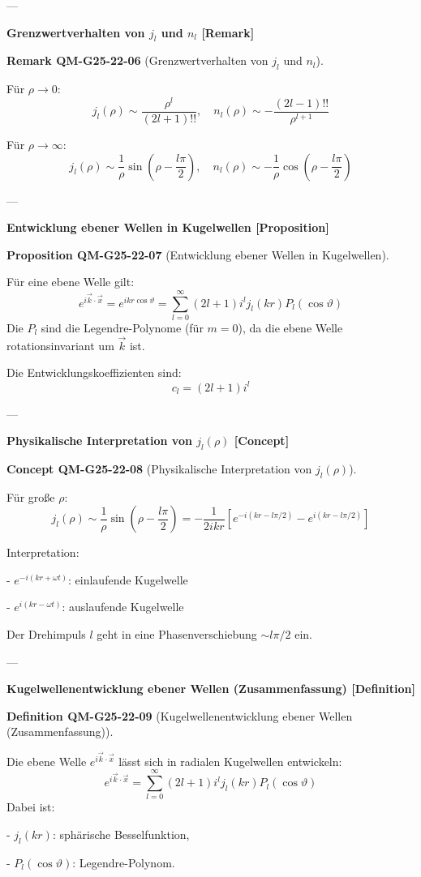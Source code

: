 \documentclass[10pt, letterpaper]{article}
\newcommand{\CustomHeading}[3]{%
  \par\medskip\noindent%
  \textbf{#1 #2} \textnormal{(#3)}.\enskip%
}
\newenvironment{DEF}[2]{\begin{unitbox}\CustomHeading{Definition}{#1}{#2}}{\end{unitbox}}
\newenvironment{PROP}[2]{\begin{unitbox}\CustomHeading{Proposition}{#1}{#2}}{\end{unitbox}}
\newenvironment{REM}[2]{\begin{unitbox}\CustomHeading{Remark}{#1}{#2}}{\end{unitbox}}
\newenvironment{CONC}[2]{\begin{unitbox}\CustomHeading{Concept}{#1}{#2}}{\end{unitbox}}
\begin{document}
---

\textbf{Grenzwertverhalten von $j_l$ und $n_l$ [Remark]}

\begin{REM}{QM-G25-22-06}{Grenzwertverhalten von $j_l$ und $n_l$}
Für $\rho \to 0$:
\[
j_l(\rho) \sim \frac{\rho^l}{(2l + 1)!!}, \quad n_l(\rho) \sim -\frac{(2l - 1)!!}{\rho^{l+1}}
\]

Für $\rho \to \infty$:
\[
j_l(\rho) \sim \frac{1}{\rho} \sin \left( \rho - \frac{l\pi}{2} \right), \quad n_l(\rho) \sim -\frac{1}{\rho} \cos \left( \rho - \frac{l\pi}{2} \right)
\]
\end{REM}

---

\textbf{Entwicklung ebener Wellen in Kugelwellen [Proposition]}

\begin{PROP}{QM-G25-22-07}{Entwicklung ebener Wellen in Kugelwellen}
Für eine ebene Welle gilt:
\[
e^{i \vec{k} \cdot \vec{x}} = e^{i k r \cos \vartheta} = \sum_{l=0}^\infty (2l + 1) i^l j_l(kr) P_l(\cos \vartheta)
\]
Die $P_l$ sind die Legendre-Polynome (für $m=0$), da die ebene Welle rotationsinvariant um $\vec{k}$ ist.

Die Entwicklungskoeffizienten sind:
\[
c_l = (2l + 1) i^l
\]
\end{PROP}

---

\textbf{Physikalische Interpretation von $j_l(\rho)$ [Concept]}

\begin{CONC}{QM-G25-22-08}{Physikalische Interpretation von $j_l(\rho)$}
Für große $\rho$:
\[
j_l(\rho) \sim \frac{1}{\rho} \sin \left( \rho - \frac{l\pi}{2} \right)
= -\frac{1}{2ikr} \left[ e^{-i(kr - l\pi/2)} - e^{i(kr - l\pi/2)} \right]
\]

Interpretation:

- $e^{-i(kr + \omega t)}$: einlaufende Kugelwelle

- $e^{i(kr - \omega t)}$: auslaufende Kugelwelle

Der Drehimpuls $l$ geht in eine Phasenverschiebung $\sim l\pi/2$ ein.
\end{CONC}

---


\textbf{Kugelwellenentwicklung ebener Wellen (Zusammenfassung) [Definition]}

\begin{DEF}{QM-G25-22-09}{Kugelwellenentwicklung ebener Wellen (Zusammenfassung)}
Die ebene Welle $e^{i \vec{k} \cdot \vec{x}}$ lässt sich in radialen Kugelwellen entwickeln:
\[
e^{i \vec{k} \cdot \vec{x}} = \sum_{l=0}^\infty (2l+1) i^l j_l(kr) P_l(\cos \vartheta)
\]
Dabei ist:

- $j_l(kr)$: sphärische Besselfunktion,

- $P_l(\cos \vartheta)$: Legendre-Polynom.
\end{DEF}
\end{document}

